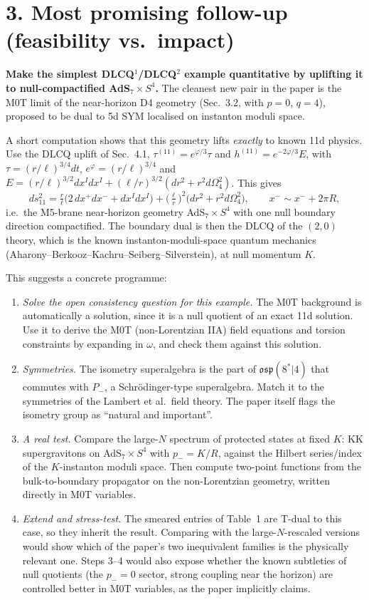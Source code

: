 \documentclass[11pt]{article}
\begin{document}
\section*{3. Most promising follow-up (feasibility vs.\ impact)}

\textbf{Make the simplest DLCQ$^1$/DLCQ$^2$ example quantitative by uplifting it to
null-compactified AdS$_7\times S^4$.}
The cleanest new pair in the paper is the M0T limit of the near-horizon D4 geometry
(Sec.~3.2, with $p=0$, $q=4$), proposed to be dual to 5d SYM localised on instanton moduli space.

A short computation shows that this geometry lifts \emph{exactly} to known 11d physics. Use the
DLCQ uplift of Sec.~4.1, $\tau^{(11)}=e^{\varphi/3}\tau$ and $h^{(11)}=e^{-2\varphi/3}E$, with
$\tau=(r/\ell)^{3/4}dt$, $e^{\varphi}=(r/\ell)^{3/4}$ and
$E=(r/\ell)^{3/2}dx^Idx^I+(\ell/r)^{3/2}(dr^2+r^2d\Omega_4^2)$. This gives
\[
ds^2_{11}=\tfrac{r}{\ell}\big(2\,dx^+dx^-+dx^Idx^I\big)+\big(\tfrac{\ell}{r}\big)^2\big(dr^2+r^2d\Omega_4^2\big),
\qquad x^-\sim x^-+2\pi R,
\]
i.e.\ the M5-brane near-horizon geometry AdS$_7\times S^4$ with one null boundary direction
compactified. The boundary dual is then the DLCQ of the $(2,0)$ theory, which is the known
instanton-moduli-space quantum mechanics (Aharony--Berkooz--Kachru--Seiberg--Silverstein), at
null momentum $K$.

This suggests a concrete programme:
\begin{enumerate}
\item \emph{Solve the open consistency question for this example.} The M0T background is
automatically a solution, since it is a null quotient of an exact 11d solution. Use it to derive
the M0T (non-Lorentzian IIA) field equations and torsion constraints by expanding in $\omega$, and
check them against this solution.
\item \emph{Symmetries.} The isometry superalgebra is the part of
$\mathfrak{osp}(8^*|4)$ that commutes with $P_-$, a Schr\"odinger-type superalgebra. Match it to
the symmetries of the Lambert et al.\ field theory. The paper itself flags the isometry group as
``natural and important''.
\item \emph{A real test.} Compare the large-$N$ spectrum of protected states at fixed $K$: KK
supergravitons on AdS$_7\times S^4$ with $p_-=K/R$, against the Hilbert series/index of the
$K$-instanton moduli space. Then compute two-point functions from the bulk-to-boundary propagator
on the non-Lorentzian geometry, written directly in M0T variables.
\item \emph{Extend and stress-test.} The smeared entries of Table~1 are T-dual to this case, so
they inherit the result. Comparing with the large-$N$-rescaled versions would show which of the
paper's two inequivalent families is the physically relevant one. Steps 3--4 would also expose
whether the known subtleties of null quotients (the $p_-=0$ sector, strong coupling near the
horizon) are controlled better in M0T variables, as the paper implicitly claims.
\end{enumerate}
\end{document}
